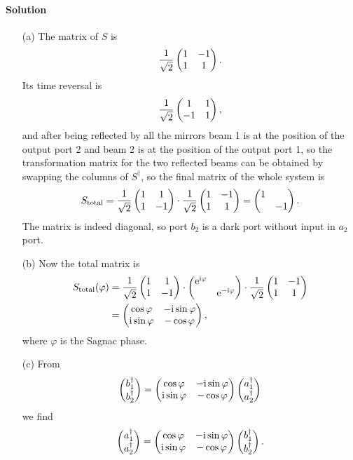 \documentclass[hyperref, a4paper]{article}
\newcommand*{\ii}{\mathrm{i}}
\newcommand*{\ee}{\mathrm{e}}
\begin{document}
\paragraph{Solution} \begin{itemize}
    \item[(a)] The matrix of $S$ is 
    \[
        \frac{1}{\sqrt{2}} \pmqty{ 1 & -1 \\ 1 & 1 }.
    \]
    Its time reversal is 
    \[
        \frac{1}{\sqrt{2}} \pmqty{ 1 & 1 \\ -1 & 1 },
    \]
    and after being reflected by all the mirrors beam 1 is at the position of the output port 2 and beam 2 is at the position of the output port 1, so the transformation matrix for the two reflected beams can be obtained by swapping the columns of $S^\dagger$, so the final matrix of the whole system is 
    \begin{equation}
        S_\text{total} = \frac{1}{\sqrt{2}} \pmqty{ 1 & 1 \\ 1 & -1 } \cdot \frac{1}{\sqrt{2}} \pmqty{ 1 & -1 \\ 1 & 1 } = \pmqty{\dmat{1, -1}}.
    \end{equation} 
    The matrix is indeed diagonal, so port $b_2$ is a dark port without input in $a_2$ port.
    \item[(b)] Now the total matrix is 
    \begin{equation}
        \begin{aligned}
            S_\text{total}(\varphi) &= \frac{1}{\sqrt{2}} \pmqty{ 1 & 1 \\ 1 & -1 } \cdot \pmqty{\dmat{\ee^{\ii \varphi}, \ee^{- \ii \varphi}}} \cdot \frac{1}{\sqrt{2}} \pmqty{ 1 & -1 \\ 1 & 1 } \\
            &= \pmqty{ \cos \varphi & - \ii \sin \varphi \\ \ii \sin \varphi & - \cos \varphi },
        \end{aligned}
        \label{eq:sagnac-total-matrix}
    \end{equation} 
    where $\varphi$ is the Sagnac phase.
    \item[(c)] From
    \[
        \pmqty{b_1^\dagger \\ b_2^\dagger} = \pmqty{ \cos \varphi & - \ii \sin \varphi \\ \ii \sin \varphi & - \cos \varphi } \pmqty{a_1^\dagger \\ a_2^\dagger}
    \]
    we find 
    \begin{equation}
        \pmqty{a_1^\dagger \\ a_2^\dagger} = \pmqty{ \cos \varphi & - \ii \sin \varphi \\ \ii \sin \varphi & - \cos \varphi } \pmqty{b_1^\dagger \\ b_2^\dagger}.

\end{equation}
\end{itemize}
\end{document}
